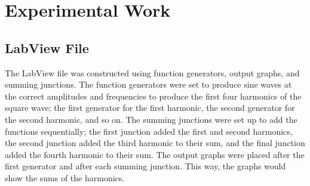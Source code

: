 \documentclass[main.tex]{subfile}
\begin{document}
	\section{Experimental Work}
	\subsection{LabView File}
	
	The LabView file was constructed using function generators, output graphs, and
	summing junctions. The function generators were set to produce sine waves at
	the correct amplitudes and frequencies to produce the first four harmonics of
	the square wave; the first generator for the first harmonic, the second
	generator for the second harmonic, and so on. The summing junctions were set
	up to add the functions sequentially; the first junction added the first and
	second harmonics, the second junction added the third harmonic to their sum,
	and the final junction added the fourth harmonic to their sum. The output
	graphs were placed after the first generator and after each summing junction.
	This way, the graphs would show the sums of the harmonics.
\end{document}
